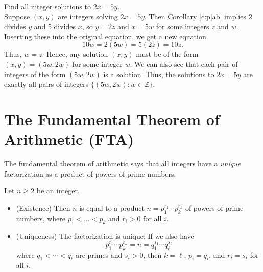 \documentclass[11pt,dvipsnames]{book}
\numberwithin{equation}{section} %
\numberwithin{figure}{section} %
\numberwithin{table}{section} %
\begin{document}
 \begin{example}
 \label{ex:2x=5y}
 Find all integer solutions to $2x=5y$. \\

 
 Suppose $(x,y)$ are integers solving $2x=5y$. Then Corollary \ref{c:p|ab} implies $2$ divides $y$ and $5$ divides $x$, so $y=2z$ and $x=5w$ for some integers $z$ and $w$. Inserting these into the original equation, we get a new equation 
 \[
 10w = 2(5w)=5(2z) = 10z.
 \]
 Thus, $w=z$. Hence, any solution $(x,y)$ must be of the form $(x,y)=(5w,2w)$ for some integer $w$. We can also see that each pair of integers of the form $(5w,2w)$ is a solution. Thus, the solutions to $2x=5y$ are exactly all pairs of integers $\{(5w,2w) :  w\in\mathbb{Z}\}$. 
 
 \end{example}



\section{The Fundamental Theorem of Arithmetic (FTA)}



The fundamental theorem of arithmetic says that all integers have a \emph{unique} factorization as a product of powers of prime numbers. 

\begin{theorem} \label{t:FTA} Let $n\geq 2$ be an integer.
\begin{itemize}
\item (Existence) Then $n$ is equal to a product $n=p_1^{r_{1}}\cdots p_k^{r_{k}}$ of powers of prime numbers, where $p_1< \ldots < p_k$ and $r_{i}>0$ for all $i$.
\item (Uniqueness) The factorization is unique: If we also have
$$ p_1^{r_{1}}\cdots p_k^{r_{k}} = n = q_1^{s_1}\cdots q_\ell^{s_{\ell}}$$
where  $q_{1}<\cdots < q_{\ell}$ are primes and $s_{i}> 0$, then $k=\ell$, $p_i=q_i$, and $r_{i}=s_{i}$ for all $i$.
\end{itemize}
\end{theorem}
\end{document}
